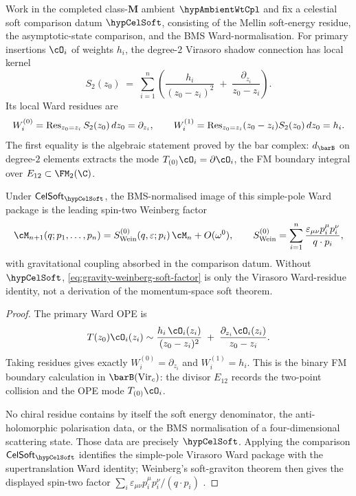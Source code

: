 \begin{theorem}
\label{thm:gravity-weinberg-from-ainf}
Work in the completed class-\(\mathbf M\) ambient \(\hypAmbientWtCpl\)
and fix a celestial soft comparison datum \(\hypCelSoft\), consisting
of the Mellin soft-energy residue, the asymptotic-state comparison,
and the BMS Ward-normalisation. For primary insertions \(\cO_i\) of
weights \(h_i\), the degree-$2$ Virasoro shadow connection has local
kernel
\begin{equation}\label{eq:gravity-weinberg-soft-factor}
S_2(z_0)
\;=\;
\sum_{i=1}^{n}
\left(
\frac{h_i}{(z_0-z_i)^2}
\;+\;
\frac{\partial_{z_i}}{z_0-z_i}
\right).
\end{equation}
Its local Ward residues are
\[
W_i^{(0)}=\operatorname{Res}_{z_0=z_i}S_2(z_0)\,dz_0=\partial_{z_i},
\qquad
W_i^{(1)}=\operatorname{Res}_{z_0=z_i}(z_0-z_i)S_2(z_0)\,dz_0=h_i .
\]
The first equality is the algebraic statement proved by the bar
complex: \(d_{\barB}\) on degree-$2$ elements extracts the mode
\(T_{(0)}\cO_i=\partial\cO_i\), the FM boundary integral over
\(E_{12}\subset\FM_2(\C)\).

Under \(\mathsf{CelSoft}_{\hypCelSoft}\), the BMS-normalised image of
this simple-pole Ward package is the leading spin-two Weinberg factor
\[
\cM_{n+1}(q;p_1,\ldots,p_n)
=
S_{\mathrm{Wein}}^{(0)}(q,\varepsilon;p_i)\,\cM_n
 + O(\omega^0),
\qquad
S_{\mathrm{Wein}}^{(0)}
=
\sum_{i=1}^{n}
\frac{\varepsilon_{\mu\nu}p_i^\mu p_i^\nu}{q\cdot p_i},
\]
with gravitational coupling absorbed in the comparison datum. Without
\(\hypCelSoft\), \eqref{eq:gravity-weinberg-soft-factor} is only the
Virasoro Ward-residue identity, not a derivation of the momentum-space
soft theorem.
\end{theorem}

\begin{proof}
The primary Ward OPE is
\[
T(z_0)\cO_i(z_i)
\sim
\frac{h_i\,\cO_i(z_i)}{(z_0-z_i)^2}
\;+\;
\frac{\partial_{z_i}\cO_i(z_i)}{z_0-z_i}.
\]
Taking residues gives exactly \(W_i^{(0)}=\partial_{z_i}\) and
\(W_i^{(1)}=h_i\). This is the binary FM boundary calculation in
\(\barB(\mathrm{Vir}_c)\): the divisor \(E_{12}\) records the
two-point collision and the OPE mode \(T_{(0)}\cO_i\).

No chiral residue contains by itself the soft energy denominator,
the anti-holomorphic polarisation data, or the BMS normalisation of a
four-dimensional scattering state. Those data are precisely
\(\hypCelSoft\). Applying the comparison
\(\mathsf{CelSoft}_{\hypCelSoft}\) identifies the simple-pole Virasoro
Ward package with the supertranslation Ward identity; Weinberg's
soft-graviton theorem then gives the displayed spin-two factor
\(\sum_i\varepsilon_{\mu\nu}p_i^\mu p_i^\nu/(q\cdot p_i)\)
\cite{Weinberg65,HMPS15,Strominger18}.
\end{proof}

